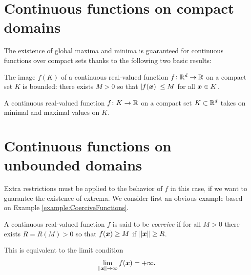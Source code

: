 \section{Continuous functions on compact domains}
The existence of global maxima and minima is guaranteed for continuous functions over compact sets thanks to the following two basic results:

\begin{theorem}\label{theorem:BVT}
The image $f(K)$ of a continuous real-valued function $f \colon \mathbb{R}^d \to \mathbb{R}$ on a compact set $K$ is bounded: there exists $M>0$ so that $\lvert  f(\boldsymbol{x})  \rvert \leq M$ for all $\boldsymbol{x} \in K$.
\end{theorem}

\begin{theorem}\label{theorem:EVT}
A continuous real-valued function $f \colon K \to \mathbb{R}$ on a compact set $K \subset \mathbb{R}^d$ takes on minimal and maximal values on $K$.
\end{theorem}

\section{Continuous functions on unbounded domains}
Extra restrictions must be applied to the behavior of $f$ in this case, if we want to guarantee the existence of extrema. We consider first an obvious example based on Example \ref{example:CoerciveFunctions}.

\begin{definition}\label{def:coerciveFunctions}
A continuous real-valued function $f$ is said to be \emph{coercive} if for all $M>0$ there exists $R=R(M)>0$ so that $f(\boldsymbol{x})\geq M$ if $\lVert \boldsymbol{x} \rVert\geq R$.
\end{definition}

\begin{remark}
This is equivalent to the limit condition  
\begin{equation*}
\lim_{\lVert \boldsymbol{x} \rVert\to \infty} f(\boldsymbol{x}) = +\infty.
\end{equation*}
\end{remark}

